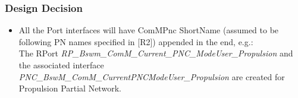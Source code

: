 \subsubsection{Design Decision}

\begin{itemize}
	\item All the Port interfaces will have ComMPnc ShortName (assumed to be following PN names specified in [R2]) appended in the end, e.g.:\\
	The RPort \textit{RP\_Bswm\_ComM\_Current\_PNC\_ModeUser\_Propulsion} and the associated interface \textit{PNC\_BswM\_ComM\_CurrentPNCModeUser\_Propulsion} are created for Propulsion Partial Network.
\end{itemize}

